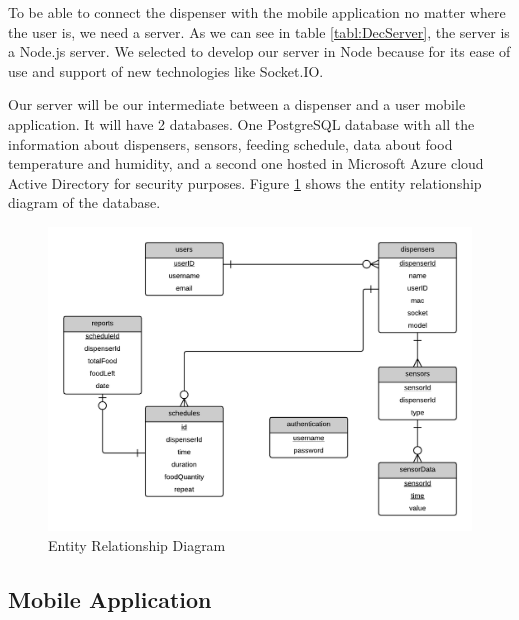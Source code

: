 \documentclass[12pt]{article}
\begin{document}
To be able to connect the dispenser with the mobile application no matter where the user is, we need a server. As we can see in table \ref{tabl:DecServer}, the server is a Node.js server. We selected to develop our server in Node because for its ease of use and support of new technologies like Socket.IO.

Our server will be our intermediate between a dispenser and a user mobile application. It will have 2 databases. One PostgreSQL database with all the information about dispensers, sensors, feeding schedule, data about food temperature and humidity, and a second one hosted in Microsoft Azure cloud Active Directory for security purposes. Figure \ref{fig:EntityRelationship} shows the entity relationship diagram of the database.

\begin{figure}[!htb]
  \begin{center}
    \includegraphics[scale=0.35]{Figures/EntityRelationship}
  \end{center}
  \caption{Entity Relationship Diagram}
  \label{fig:EntityRelationship}
\end{figure}


\subsection{Mobile Application}
\end{document}
